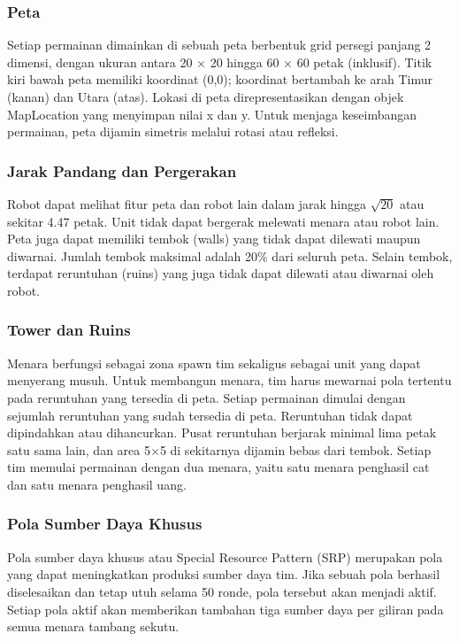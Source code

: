\documentclass{article}
\begin{document}
\subsubsection{Peta}

Setiap permainan dimainkan di sebuah peta berbentuk grid persegi panjang 2 dimensi, dengan 
ukuran antara 20 $\times$ 20 hingga 60 $\times$ 60 petak (inklusif). Titik kiri bawah peta memiliki koordinat (0,0); 
koordinat bertambah ke arah Timur (kanan) dan Utara (atas). Lokasi di peta direpresentasikan 
dengan objek MapLocation yang menyimpan nilai x dan y. 
Untuk menjaga keseimbangan permainan, peta dijamin simetris melalui rotasi atau refleksi. 


\subsubsection{Jarak Pandang dan Pergerakan}

Robot dapat melihat fitur peta dan robot lain dalam jarak hingga $\sqrt{20}$ atau sekitar 4.47 
petak. Unit tidak dapat bergerak melewati menara atau robot lain. Peta juga dapat memiliki tembok 
(walls) yang tidak dapat dilewati maupun diwarnai. Jumlah tembok maksimal adalah 20\% dari 
seluruh peta.  
Selain tembok, terdapat reruntuhan (ruins) yang juga tidak dapat dilewati atau diwarnai oleh robot. 

\subsubsection{Tower dan Ruins}

Menara berfungsi sebagai zona spawn tim sekaligus sebagai unit yang dapat menyerang musuh. 
Untuk membangun menara, tim harus mewarnai pola tertentu pada reruntuhan yang tersedia di peta. 
Setiap permainan dimulai dengan sejumlah reruntuhan yang sudah tersedia di peta. Reruntuhan 
tidak dapat dipindahkan atau dihancurkan. Pusat reruntuhan berjarak minimal lima petak satu sama 
lain, dan area 5\(\times\)5 di sekitarnya dijamin bebas dari tembok.  
Setiap tim memulai permainan dengan dua menara, yaitu satu menara penghasil cat dan satu menara 
penghasil uang. 


\subsubsection{Pola Sumber Daya Khusus}

Pola sumber daya khusus atau Special Resource Pattern (SRP) merupakan pola yang dapat 
meningkatkan produksi sumber daya tim. Jika sebuah pola berhasil diselesaikan dan tetap utuh 
selama 50 ronde, pola tersebut akan menjadi aktif.  
Setiap pola aktif akan memberikan tambahan tiga sumber daya per giliran pada semua menara 
tambang sekutu. 
\end{document}
